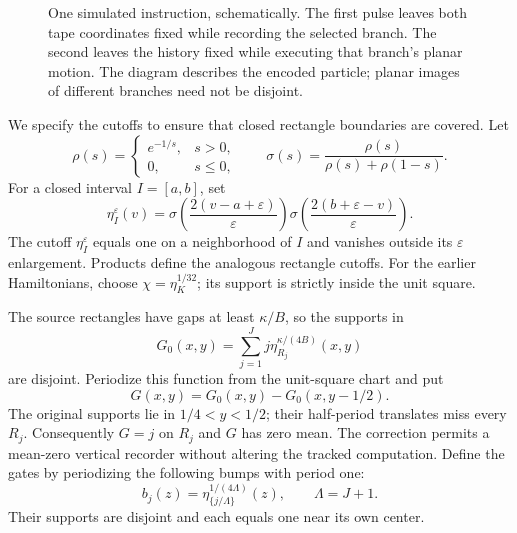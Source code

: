 \documentclass[11pt]{article}
\begin{document}
\begin{figure}[ht]
\centering
{}
\caption{One simulated instruction, schematically. The first pulse leaves
both tape coordinates fixed while recording the selected branch. The
second leaves the history fixed while executing that branch's planar
motion. The diagram describes the encoded particle; planar images of
different branches need not be disjoint.}
\label{fig:pulses}
\end{figure}

We specify the cutoffs to ensure that closed rectangle boundaries are
covered. Let
\[
 \rho(s)=\begin{cases}e^{-1/s},&s>0,\\0,&s\leq0,\end{cases}
 \qquad \sigma(s)=\frac{\rho(s)}{\rho(s)+\rho(1-s)}.
\]
For a closed interval $I=[a,b]$, set
\[
 \eta_I^\varepsilon(v)=
 \sigma\!\left(\frac{2(v-a+\varepsilon)}{\varepsilon}\right)
 \sigma\!\left(\frac{2(b+\varepsilon-v)}{\varepsilon}\right).
\]
The cutoff $\eta_I^\varepsilon$ equals one on a neighborhood of $I$
and vanishes outside its $\varepsilon$ enlargement. Products define
the analogous rectangle cutoffs. For the earlier Hamiltonians, choose
$\chi=\eta_K^{1/32}$; its support is strictly inside the unit square.

The source rectangles have gaps at least $\kappa/B$, so the supports in
\[
 G_0(x,y)=\sum_{j=1}^Jj\eta_{R_j}^{\kappa/(4B)}(x,y)
\]
are disjoint. Periodize this function from the unit-square chart and put
\[
 G(x,y)=G_0(x,y)-G_0(x,y-1/2).
\]
The original supports lie in $1/4<y<1/2$; their half-period translates
miss every $R_j$. Consequently $G=j$ on $R_j$ and $G$ has zero mean.
The correction permits a mean-zero vertical recorder without altering
the tracked computation. Define the gates by periodizing the following
bumps with period one:
\[
 b_j(z)=\eta_{\{j/\Lambda\}}^{1/(4\Lambda)}(z),
 \qquad \Lambda=J+1.
\]
Their supports are disjoint and each equals one near its own center.
\end{document}
